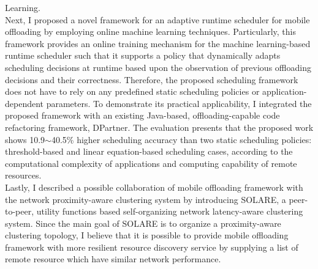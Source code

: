 Learning.\\
%
Next, I proposed a novel framework for an adaptive runtime scheduler for
mobile offloading by employing online machine learning techniques.
%
Particularly, this framework provides an online training mechanism for
the machine learning-based runtime scheduler such that it supports a
policy that dynamically adapts scheduling decisions at runtime based
upon the observation of previous offloading decisions and their
correctness.
%
Therefore, the proposed scheduling framework does not have to rely on any
predefined static scheduling policies or application-dependent
parameters.
%
To demonstrate its practical applicability, I integrated the proposed
framework with an existing Java-based, offloading-capable code
refactoring framework, DPartner.
%
The evaluation presents that the proposed work shows 10.9$\sim$40.5\%
higher scheduling accuracy than two static scheduling policies:
threshold-based and linear equation-based scheduling cases, according to
the computational complexity of applications and computing capability of
remote resources.\\
%
Lastly, I described a possible collaboration of mobile offloading
framework with the network proximity-aware clustering system by
introducing SOLARE, a peer-to-peer, utility functions based
self-organizing network latency-aware clustering system.
%
Since the main goal of SOLARE is to organize a proximity-aware
clustering topology, I believe that it is possible to provide mobile
offloading framework with more resilient resource discovery service by
supplying a list of remote resource which have similar network
performance.\\
%

